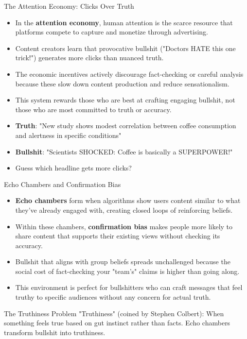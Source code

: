 \documentclass{beamer}
\begin{document}
	\begin{frame}{The Attention Economy: Clicks Over Truth}
		\begin{itemize}
			\item In the \textbf{attention economy}, human attention is the scarce resource that platforms compete to capture and monetize through advertising.
			\item Content creators learn that provocative bullshit ("Doctors HATE this one trick!") generates more clicks than nuanced truth.
			\item The economic incentives actively discourage fact-checking or careful analysis because these slow down content production and reduce sensationalism.
			\item This system rewards those who are best at crafting engaging bullshit, not those who are most committed to truth or accuracy.
		\end{itemize}
		
		\begin{example}
			\begin{itemize}
				\scriptsize
				\item \textbf{Truth}: "New study shows modest correlation between coffee consumption and alertness in specific conditions"
				\item \textbf{Bullshit}: "Scientists SHOCKED: Coffee is basically a SUPERPOWER!"
				\item Guess which headline gets more clicks?
			\end{itemize}
		\end{example}
	\end{frame}
	
	\begin{frame}{Echo Chambers and Confirmation Bias}
		\begin{itemize}
			\item \textbf{Echo chambers} form when algorithms show users content similar to what they've already engaged with, creating closed loops of reinforcing beliefs.
			\item Within these chambers, \textbf{confirmation bias} makes people more likely to share content that supports their existing views without checking its accuracy.
			\item Bullshit that aligns with group beliefs spreads unchallenged because the social cost of fact-checking your "team's" claims is higher than going along.
			\item This environment is perfect for bullshitters who can craft messages that feel truthy to specific audiences without any concern for actual truth.
		\end{itemize}
		
		\begin{alertblock}{The Truthiness Problem}
			"Truthiness" (coined by Stephen Colbert): When something feels true based on gut instinct rather than facts. Echo chambers transform bullshit into truthiness.
		\end{alertblock}
	\end{frame}
	
\end{document}
